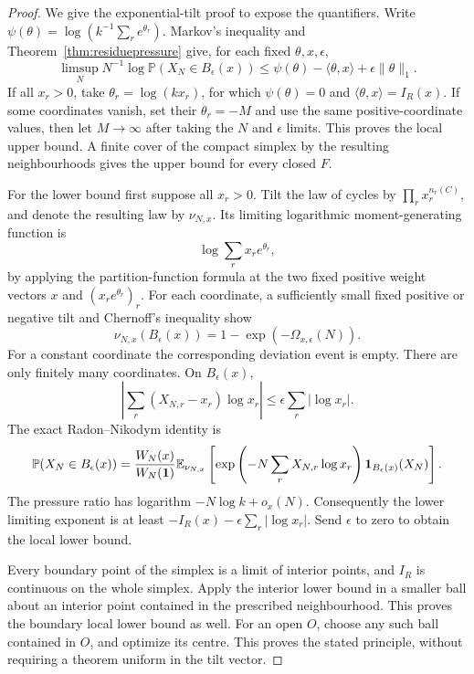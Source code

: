 \begin{proof}
We give the exponential-tilt proof to expose the quantifiers.
Write
\(\psi(\theta)=\log(k^{-1}\sum_re^{\theta_r})\).
Markov's inequality and Theorem~\ref{thm:residuepressure}
give, for each fixed \(\theta,x,\epsilon\),
\[
 \limsup_N N^{-1}\log\mathbb P(X_N\in B_\epsilon(x))
 \leq \psi(\theta)-\langle\theta,x\rangle
                                      +\epsilon\|\theta\|_1.
\]
If all \(x_r>0\), take \(\theta_r=\log(kx_r)\), for which
\(\psi(\theta)=0\) and \(\langle\theta,x\rangle=I_R(x)\).
If some coordinates vanish, set their \(\theta_r=-M\)
and use the same positive-coordinate values, then let
\(M\to\infty\) after taking the \(N\) and \(\epsilon\) limits.
This proves the local upper bound.
A finite cover of the compact simplex by the resulting
neighbourhoods gives the upper bound for every closed \(F\).

For the lower bound first suppose all \(x_r>0\).
Tilt the law of cycles by \(\prod_rx_r^{n_r(C)}\), and denote
the resulting law by \(\nu_{N,x}\).
Its limiting logarithmic moment-generating function is
\[
 \log\sum_rx_re^{\theta_r},
\]
by applying the partition-function formula at the two fixed
positive weight vectors \(x\) and \((x_re^{\theta_r})_r\).
For each coordinate, a sufficiently small fixed positive or
negative tilt and Chernoff's inequality show
\[
 \nu_{N,x}(B_\epsilon(x))=1-\exp(-\Omega_{x,\epsilon}(N)).
\]
For a constant coordinate the corresponding deviation event
is empty. There are only finitely many coordinates.
On \(B_\epsilon(x)\),
\[
 \left|\sum_r(X_{N,r}-x_r)\log x_r\right|
                        \leq\epsilon\sum_r|\log x_r|.
\]
The exact Radon--Nikodym identity is
\[
 \mathbb P(X_N\in B_\epsilon(x))
 =\frac{W_N(x)}{W_N(\mathbf1)}
   \mathbb E_{\nu_{N,x}}\left[
       \exp\left(-N\sum_r X_{N,r}\log x_r\right)
                        \mathbf1_{B_\epsilon(x)}(X_N)\right].
\]
The pressure ratio has logarithm \(-N\log k+o_x(N)\).
Consequently the lower limiting exponent is at least
\(-I_R(x)-\epsilon\sum_r|\log x_r|\).
Send \(\epsilon\) to zero to obtain the local lower bound.

Every boundary point of the simplex is a limit of interior
points, and \(I_R\) is continuous on the whole simplex.
Apply the interior lower bound in a smaller ball about an
interior point contained in the prescribed neighbourhood.
This proves the boundary local lower bound as well.
For an open \(O\), choose any such ball contained in \(O\),
and optimize its centre. This proves the stated principle,
without requiring a theorem uniform in the tilt vector.
\end{proof}

